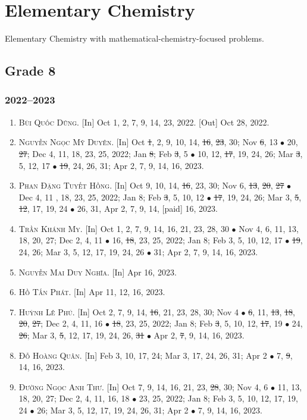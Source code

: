 \documentclass{article}
\begin{document}

\section{Elementary Chemistry}
Elementary Chemistry with mathematical-chemistry-focused problems.

\subsection{Grade 8}

\subsubsection{2022--2023}

\begin{enumerate}
	\item \textsc{Bùi Quốc Dũng.} \textsf{[In]} Oct 1, 2, 7, 9, 14, 23, 2022. \textsf{[Out]} Oct 28, 2022.
	\item \textsc{Nguyễn Ngọc Mỹ Duyên.} \textsf{[In]} Oct \st{1}, 2, 9, 10, 14, \st{16}, \st{23}, 30; Nov \st{6}, 13 $\bullet$ 20, \st{27}; Dec 4, 11, 18, 23, 25, 2022; Jan \st{8}; Feb \st{3}, 5 $\bullet$ 10, 12, \st{17}, 19, 24, 26; Mar \st{3}, 5, 12, 17 $\bullet$ \st{19}, 24, 26, 31; Apr 2, 7, 9, 14, 16, 2023.
	\item \textsc{Phan Đặng Tuyết Hồng.} \textsf{[In]} Oct 9, 10, 14, \st{16}, 23, 30; Nov 6, \st{13}, \st{20}, \st{27} $\bullet$ Dec 4, 11 , 18, 23, 25, 2022; Jan 8; Feb \st{3}, 5, 10, 12 $\bullet$ \st{17}, 19, 24, 26; Mar 3, \st{5}, \st{12}, 17, 19, 24 $\bullet$ 26, 31, Apr 2, 7, 9, 14, [paid] 16, 2023.
	\item \textsc{Trần Khánh My.} \textsf{[In]} Oct 1, 2, 7, 9, 14, 16, 21, 23, 28, 30 $\bullet$ Nov 4, 6, 11, 13, 18, 20, 27; Dec 2, 4, 11 $\bullet$ 16, \st{18}, 23, 25, 2022; Jan 8; Feb 3, 5, 10, 12, 17 $\bullet$ \st{19}, 24, 26; Mar 3, 5, 12, 17, 19, 24, 26 $\bullet$ 31; Apr 2, 7, 9, 14, 16, 2023.
	\item \textsc{Nguyễn Mai Duy Nghĩa.} \textsf{[In]} Apr 16, 2023.
	\item \textsc{Hồ Tấn Phát.} \textsf{[In]} Apr 11, 12, 16, 2023.
	\item \textsc{Huỳnh Lê Phú.} \textsf{[In]} Oct 2, 7, 9, 14, \st{16}, 21, 23, 28, 30; Nov 4 $\bullet$ \st{6}, 11, \st{13}, \st{18}, \st{20}, \st{27}; Dec 2, 4, 11, 16 $\bullet$ \st{18}, 23, 25, 2022; Jan 8; Feb \st{3}, 5, 10, 12, \st{17}, 19 $\bullet$ 24, \st{26}; Mar 3, \st{5}, 12, 17, 19, 24, 26, \st{31} $\bullet$ Apr 2, \st{7}, 9, 14, 16, 2023.
	\item \textsc{Đỗ Hoàng Quân.} \textsf{[In]} Feb 3, 10, 17, 24; Mar 3, 17, 24, 26, 31; Apr 2 $\bullet$ 7, \st{9}, 14, 16, 2023.
	\item \textsc{Đường Ngọc Anh Thư.} \textsf{[In]} Oct 7, 9, 14, 16, 21, 23, \st{28}, 30; Nov 4, 6 $\bullet$ 11, 13, 18, 20, 27; Dec 2, 4, 11, 16, 18 $\bullet$ 23, 25, 2022; Jan 8; Feb 3, 5, 10, 12, 17, 19, 24 $\bullet$ 26; Mar 3, 5, 12, 17, 19, 24, 26, 31; Apr 2 $\bullet$ 7, 9, 14, 16, 2023.
\end{enumerate}
\end{document}
